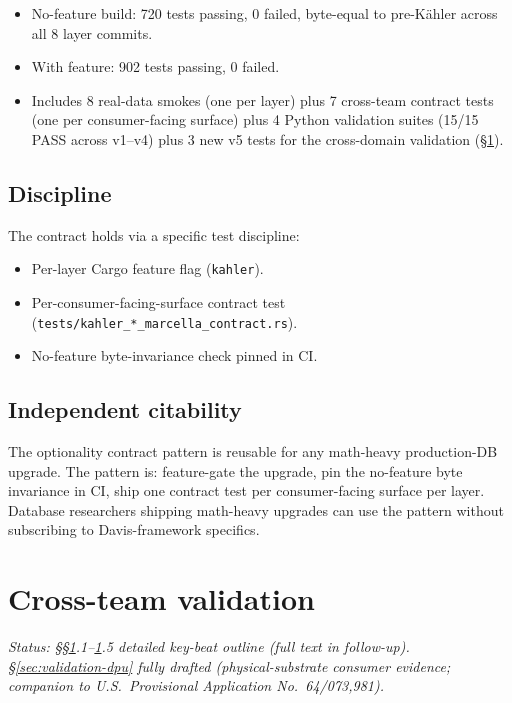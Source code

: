 \documentclass[11pt,letterpaper]{article}
\begin{document}
\begin{itemize}[nosep]
\item No-feature build: 720 tests passing, 0 failed, byte-equal to
  pre-K\"ahler across all 8 layer commits.
\item With feature: 902 tests passing, 0 failed.
\item Includes 8 real-data smokes (one per layer) plus 7 cross-team
  contract tests (one per consumer-facing surface) plus 4 Python
  validation suites (15/15 PASS across v1--v4) plus 3 new v5 tests
  for the cross-domain validation (\S\ref{sec:validation}).
\end{itemize}

\subsection{Discipline}

The contract holds via a specific test discipline:

\begin{itemize}[nosep]
\item Per-layer Cargo feature flag (\texttt{kahler}).
\item Per-consumer-facing-surface contract test
  (\texttt{tests/kahler\_*\_marcella\_contract.rs}).
\item No-feature byte-invariance check pinned in CI.
\end{itemize}

\subsection{Independent citability}

The optionality contract pattern is reusable for any math-heavy
production-DB upgrade. The pattern is: feature-gate the upgrade, pin
the no-feature byte invariance in CI, ship one contract test per
consumer-facing surface per layer. Database researchers shipping
math-heavy upgrades can use the pattern without subscribing to
Davis-framework specifics.


\section{Cross-team validation}
\label{sec:validation}

\noindent\emph{Status: \S\S\ref{sec:validation}.1--\ref{sec:validation}.5
detailed key-beat outline (full text in follow-up).
\S\ref{sec:validation-dpu} fully drafted (physical-substrate consumer
evidence; companion to U.S.\ Provisional Application
No.~64/073,981).}
\end{document}

